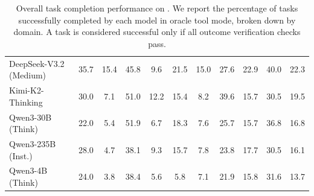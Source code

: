 \begin{table}[!h]
{\begin{tabular}{lcccccccccc}
DeepSeek-V3.2 (Medium)~\citep{deepseekai2024deepseekv3technicalreport} & 35.7 & 15.4 & 45.8 & 9.6 & 21.5 & 15.0 & 27.6 & 22.9 & 40.0 & 22.3 \\
Kimi-K2-Thinking~\citep{kimiteam2025kimik2openagentic} & 30.0 & 7.1 & 51.0 & 12.2 & 15.4 & 8.2 & 39.6 & 15.7 & 30.5 & 19.5 \\
Qwen3-30B (Think)~\citep{qwen3} & 22.0 & 5.4 & {51.9} & 6.7 & 18.3 & 7.6 & 25.7 & 15.7 & 36.8 & 16.8 \\
Qwen3-235B (Inst.)~\citep{qwen3} & 28.0 & 4.7 & 38.1 & 9.3 & 15.7 & 7.8 & 23.8 & 17.7 & 30.5 & 16.1 \\
Qwen3-4B (Think)~\citep{qwen3} & 24.0 & 3.8 & 38.4 & 5.6 & 5.8 & 7.1 & 21.9 & 15.8 & 31.6 & 13.7 \\
\bottomrule
\end{tabular}%
}
\caption{Overall task completion performance on \ours{}. We report the percentage of tasks successfully completed by each model in oracle tool mode, broken down by domain. A task is considered successful only if all outcome verification checks pass.}
\label{tab:main_results}
\end{table}
